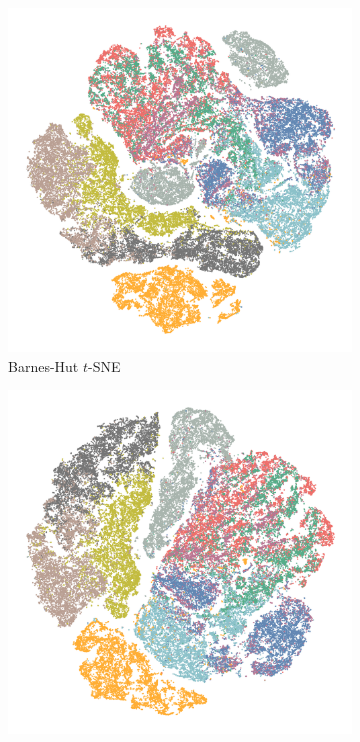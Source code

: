 \begin{appendix}
\begin{figure}[tbp]
  \centering
  \begin{subfigure}{0.45\linewidth}
    \centering
    \includegraphics[width=\linewidth]{img/emb/bhtsne_fashion_mnist}
    \caption{Barnes-Hut $t$-SNE}
  \end{subfigure}
\begin{subfigure}{0.45\linewidth}
  \centering
    \includegraphics[width=\linewidth]{img/emb/fitsne_fashion_mnist}

\end{subfigure}
\end{figure}
\end{appendix}
